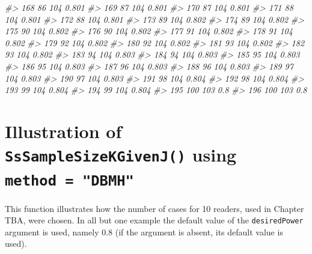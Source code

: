 \documentclass[
]{book}
\newenvironment{Shaded}{\begin{snugshade}}{\end{snugshade}}
\newcommand{\CommentTok}[1]{\textcolor[rgb]{0.56,0.35,0.01}{\textit{#1}}}
\begin{document}
\begin{Shaded}
\begin{Highlighting}[]
\CommentTok{\#\textgreater{} 168         86      104 0.801}
\CommentTok{\#\textgreater{} 169         87      104 0.801}
\CommentTok{\#\textgreater{} 170         87      104 0.801}
\CommentTok{\#\textgreater{} 171         88      104 0.801}
\CommentTok{\#\textgreater{} 172         88      104 0.801}
\CommentTok{\#\textgreater{} 173         89      104 0.802}
\CommentTok{\#\textgreater{} 174         89      104 0.802}
\CommentTok{\#\textgreater{} 175         90      104 0.802}
\CommentTok{\#\textgreater{} 176         90      104 0.802}
\CommentTok{\#\textgreater{} 177         91      104 0.802}
\CommentTok{\#\textgreater{} 178         91      104 0.802}
\CommentTok{\#\textgreater{} 179         92      104 0.802}
\CommentTok{\#\textgreater{} 180         92      104 0.802}
\CommentTok{\#\textgreater{} 181         93      104 0.802}
\CommentTok{\#\textgreater{} 182         93      104 0.802}
\CommentTok{\#\textgreater{} 183         94      104 0.803}
\CommentTok{\#\textgreater{} 184         94      104 0.803}
\CommentTok{\#\textgreater{} 185         95      104 0.803}
\CommentTok{\#\textgreater{} 186         95      104 0.803}
\CommentTok{\#\textgreater{} 187         96      104 0.803}
\CommentTok{\#\textgreater{} 188         96      104 0.803}
\CommentTok{\#\textgreater{} 189         97      104 0.803}
\CommentTok{\#\textgreater{} 190         97      104 0.803}
\CommentTok{\#\textgreater{} 191         98      104 0.804}
\CommentTok{\#\textgreater{} 192         98      104 0.804}
\CommentTok{\#\textgreater{} 193         99      104 0.804}
\CommentTok{\#\textgreater{} 194         99      104 0.804}
\CommentTok{\#\textgreater{} 195        100      103   0.8}
\CommentTok{\#\textgreater{} 196        100      103   0.8}
\end{Highlighting}
\end{Shaded}

\hypertarget{illustration-of-sssamplesizekgivenj-using-method-dbmh}{%
\section{\texorpdfstring{Illustration of \texttt{SsSampleSizeKGivenJ()} using \texttt{method\ =\ "DBMH"}}{Illustration of SsSampleSizeKGivenJ() using method = "DBMH"}}\label{illustration-of-sssamplesizekgivenj-using-method-dbmh}}

This function illustrates how the number of cases for 10 readers, used in Chapter TBA, were chosen. In all but one example the default value of the \texttt{desiredPower} argument is used, namely 0.8 (if the argument is absent, its default value is used).
\end{document}
